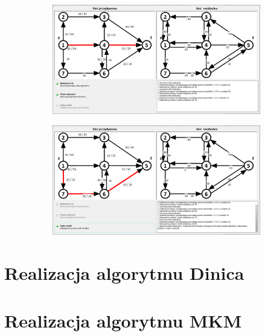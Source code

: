 \begin{appendices}
\begin{figure}[H]
\begin{subfigure}{\textwidth}
 		\end{subfigure}\par\bigskip
 		\begin{subfigure}{\textwidth}
 			\includegraphics[width=0.9\linewidth]{./img/spec_zew06_4.png}
 		\end{subfigure}\par\bigskip
 		\begin{subfigure}{\textwidth}
 			\includegraphics[width=0.9\linewidth]{./img/spec_zew06_5.png}
 		\end{subfigure}
 	\end{figure}
 	\chapter{Realizacja algorytmu Dinica}\label{add:dinicExample}
 	\chapter{Realizacja algorytmu MKM}\label{add:mkmExample}
\end{appendices}